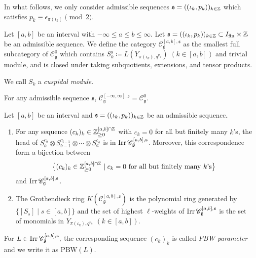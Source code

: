 In what follows, we only consider admissible sequences
$\mathfrak{s} = ((\iota_k, p_k))_{k \in \mathbb{Z}}$
which satisfies $p_k \equiv \epsilon_{\pi(\iota_k)} \pmod{2}$.

\begin{Def}
\label{Def : category}
Let $[a, b]$ be an interval with $-\infty \leq a \leq b \leq \infty$.
Let $\mathfrak{s} = ((\iota_k, p_k))_{k \in \mathbb{Z}}
\subset I_{\mathrm{fin}} \times \mathbb{Z}$ be an admissible sequence.
We define the category $\mathscr{C}_{\mathfrak{g}}^{[a, b], \mathfrak{s}}$
as the smallest full subcategory of $\mathscr{C}_{\mathfrak{g}}^{0}$ which
contains
$S_k^{\mathfrak{s}} \coloneq L(Y_{\pi(\iota_k), q^{p_k}})$
$(k \in [a, b])$ and trivial module,
and is closed under taking subquotients, extensions, and tensor products.
\end{Def}
We call $S_k$ a \emph{cuspidal module}. 

\begin{Prop}
\label{Prop : whole category}
For any admissible sequence $\mathfrak{s}$,
$\mathscr{C}_{\mathfrak{g}}^{[-\infty, \infty], \mathfrak{s}} =
\mathscr{C}_{\mathfrak{g}}^{0}$.
\end{Prop}

\begin{Prop}
\label{Prop : PBW parameterization}
Let $[a, b]$ be an interval and
$\mathfrak{s} = ((\iota_k, p_k))_{k \in \mathbb{Z}}$
be an admissible sequence.
\begin{enumerate}
    \item[(i)] For any sequence $(c_k)_k \in \mathbb{Z}_{\geq 0}^{[a, b] \cap \mathbb{Z}}$
    with $c_k = 0$ for all but finitely many $k$'s,
    the head of $S_b^{c_b} \otimes S_{b - 1}^{c_{b - 1}}
    \otimes \cdots \otimes S_a^{c_a}$
    is in $\mathop{\mathrm{Irr}}\nolimits\mathscr{C}_{\mathfrak{g}}^{[a, b], \mathfrak{s}}$.
    Moreover, this correspondence form a bijection between
    \[
    \bigl\{(c_k)_k \in \mathbb{Z}_{\geq 0}^{[a, b] \cap \mathbb{Z}}
    \mid c_k = 0\ \text{for all but finitely many }k\text{'s}\bigr\}
    \]
    and $\mathop{\mathrm{Irr}}\nolimits\mathscr{C}_{\mathfrak{g}}^{[a, b], \mathfrak{s}}$.
    \item[(ii)] The Grothendieck ring
    $K(\mathscr{C}_{\mathfrak{g}}^{[a, b], \mathfrak{s}})$ is the polynomial ring
    generated by $\{[S_s] \mid s \in [a, b]\}$
    and the set of highest $\ell$-weights
    of $\mathop{\mathrm{Irr}}\nolimits\mathscr{C}_{\mathfrak{g}}^{[a, b], \mathfrak{s}}$ is the set of
    monomials
    in $Y_{\pi(\iota_k), q^{p_k}}$ $(k \in [a, b])$.
\end{enumerate}
\end{Prop}

For $L \in \mathop{\mathrm{Irr}}\nolimits\mathscr{C}_{\mathfrak{g}}^{[a, b], \mathfrak{s}}$,
the corresponding sequence $(c_k)_k$ is called \emph{PBW parameter}
and we write it as $\mathrm{PBW}(L)$.
